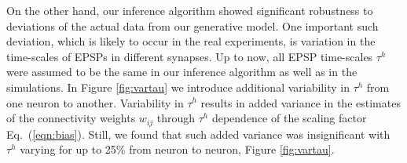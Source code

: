 On the other hand, our inference algorithm showed significant robustness to deviations of the actual data from our generative model.
One important such deviation, which is likely to occur in the real experiments, is variation in the time-scales of EPSPs in different synapses. Up to now, all EPSP time-scales $\tau^h$ were assumed to be the same in our inference algorithm as well as in the simulations.
In Figure \ref{fig:vartau} we introduce additional variability in $\tau^h$ from one neuron to another.
Variability in $\tau^h$ results in added variance in the estimates of the connectivity weights $w_{ij}$ through $\tau^h$ dependence of the scaling factor Eq.~(\eqref{eqn:bias}).
Still, we found that such added variance was insignificant with $\tau^h$ varying for up to 25\% from neuron to neuron, Figure \ref{fig:vartau}.




